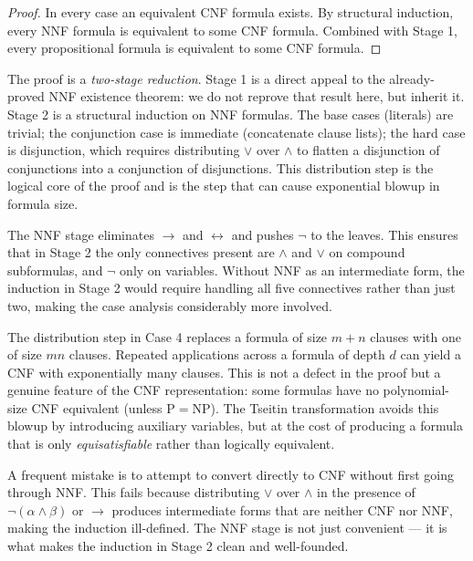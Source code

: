 \begin{proof}
\medskip
In every case an equivalent CNF formula exists. By structural induction, every
NNF formula is equivalent to some CNF formula. Combined with Stage 1, every
propositional formula is equivalent to some CNF formula. \AsReq
\end{proof}

\begin{remark*}
The proof is a \emph{two-stage reduction}. Stage 1 is a direct appeal to the
already-proved NNF existence theorem: we do not reprove that result here, but
inherit it. Stage 2 is a structural induction on NNF formulas. The base cases
(literals) are trivial; the conjunction case is immediate (concatenate clause
lists); the hard case is disjunction, which requires distributing $\vee$ over
$\wedge$ to flatten a disjunction of conjunctions into a conjunction of
disjunctions. This distribution step is the logical core of the proof and is
the step that can cause exponential blowup in formula size.
\end{remark*}

\begin{remark*}
The NNF stage eliminates $\rightarrow$ and $\leftrightarrow$ and pushes $\neg$
to the leaves. This ensures that in Stage 2 the only connectives present are
$\wedge$ and $\vee$ on compound subformulas, and $\neg$ only on variables.
Without NNF as an intermediate form, the induction in Stage 2 would require
handling all five connectives rather than just two, making the case analysis
considerably more involved.
\end{remark*}

\begin{remark*}
The distribution step in Case 4 replaces a formula of size $m + n$ clauses with
one of size $mn$ clauses. Repeated applications across a formula of depth $d$
can yield a CNF with exponentially many clauses. This is not a defect in the
proof but a genuine feature of the CNF representation: some formulas have no
polynomial-size CNF equivalent (unless $\mathrm{P} = \mathrm{NP}$). The
Tseitin transformation avoids this blowup by introducing auxiliary variables,
but at the cost of producing a formula that is only \emph{equisatisfiable}
rather than logically equivalent.
\end{remark*}

\begin{remark*}
A frequent mistake is to attempt to convert directly to CNF without first
going through NNF. This fails because distributing $\vee$ over $\wedge$ in the
presence of $\neg(\alpha \wedge \beta)$ or $\rightarrow$ produces intermediate
forms that are neither CNF nor NNF, making the induction ill-defined. The NNF
stage is not just convenient — it is what makes the induction in Stage 2 clean
and well-founded.
\end{remark*}

